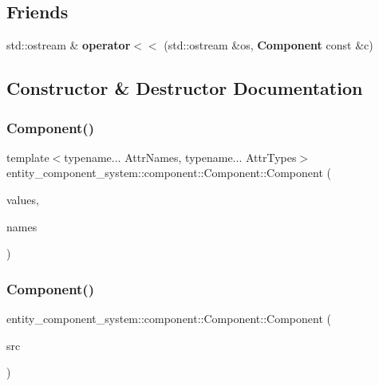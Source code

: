 \subsection*{Friends}
\begin{DoxyCompactItemize}
\item 
std\+::ostream \& {\bf operator$<$$<$} (std\+::ostream \&os, {\bf Component} const \&c)
\end{DoxyCompactItemize}


\subsection{Constructor \& Destructor Documentation}
\label{classentity__component__system_1_1component_1_1_component_ac862848295582fd4c902b2a6f2ef8a6b} 
\subsubsection{Component()\hspace{0.1cm}{\footnotesize\ttfamily [1/3]}}
{\footnotesize\ttfamily template$<$typename... Attr\+Names, typename... Attr\+Types$>$ \\
entity\+\_\+component\+\_\+system\+::component\+::\+Component\+::\+Component (\begin{DoxyParamCaption}\item[{std\+::tuple$<$ Attr\+Types... $>$ \&\&}]{values,  }\item[{Attr\+Names \&\&...}]{names }\end{DoxyParamCaption})\hspace{0.3cm}{\ttfamily [inline]}}

\label{classentity__component__system_1_1component_1_1_component_a1f887109ae335484576bc05f9e0a5be5} 
\subsubsection{Component()\hspace{0.1cm}{\footnotesize\ttfamily [2/3]}}
{\footnotesize\ttfamily entity\+\_\+component\+\_\+system\+::component\+::\+Component\+::\+Component (\begin{DoxyParamCaption}\item[{{\bf Component} const \&}]{src }\end{DoxyParamCaption})\hspace{0.3cm}{\ttfamily [default]}}

